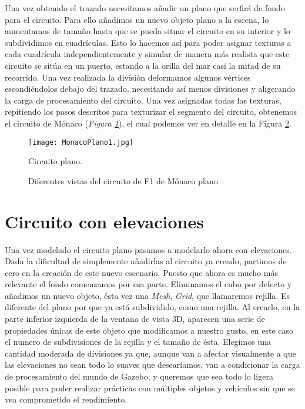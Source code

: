 Una vez obtenido el trazado necesitamos añadir un plano que serfirá de fondo para el circuito. Para ello añadimos un nuevo objeto plano a la escena, lo aumentamos de tamaño hasta que se pueda situar el circuito en su interior y lo subdividimos en cuadrículas. Esto lo hacemos así para poder asignar texturas a cada cuadrícula independientemente y simular de manera más realista que este circuito se sitúa en un puerto, estando a la orilla del mar casi la mitad de su recorrido. Una vez realizada la división deformamos algunos vértices escondiéndolos debajo del trazado, necesitando así menos divisiones y aligerando la carga de procesamiento del circuito. Una vez asignadas todas las texturas, repitiendo los pasos descritos para texturizar el segmento del circuito, obtenemos el circuito de Mónaco (\textit{Figura \ref{fig:monacoplano1}}), el cual podemos ver en detalle en la Figura \ref{fig:monacoplanovistas}.

\begin{figure}[t]
	\centering
	\texttt{[image: MonacoPlano1.jpg]}
	\caption{Circuito plano.} \label{fig:monacoplano1}
\end{figure}

\begin{figure}
	\centering
	\hspace{0.04\textwidth}	
	\vspace{0.03\textwidth}
	\hspace{0.04\textwidth}
	\caption{Diferentes vistas del circuito de F1 de Mónaco plano} \label{fig:monacoplanovistas}
\end{figure}


\section{Circuito con elevaciones}
\label{sec:pm_circuitoconelevaciones}

Una vez modelado el circuito plano pasamos a modelarlo ahora con elevaciones. Dada la dificultad de simplemente añadirlas al circuito ya creado, partimos de cero en la creación de este nuevo escenario. Puesto que ahora es mucho más relevante el fondo comenzamos por esa parte. Eliminamos el cubo por defecto y añadimos un nuevo objeto, ésta vez una \textit{Mesh}, \textit{Grid}, que llamaremos rejilla. Es diferente del plano por que ya está subdividido, como una rejilla. Al crearlo, en la parte inferior izquierda de la ventana de vista 3D, aparecen una serie de propiedades únicas de este objeto que modificamos a nuestro gusto, en este caso el numero de subdivisiones de la rejilla y el tamaño de ésta. Elegimos una cantidad moderada de divisiones ya que, aunque van a afectar visualmente a que las elevaciones no sean todo lo suaves que desearíamos, van a condicionar la carga de procesamiento del mundo de Gazebo, y queremos que sea todo lo ligera posible para poder realizar prácticas con múltiples objetos y vehículos sin que se vea comprometido el rendimiento.

